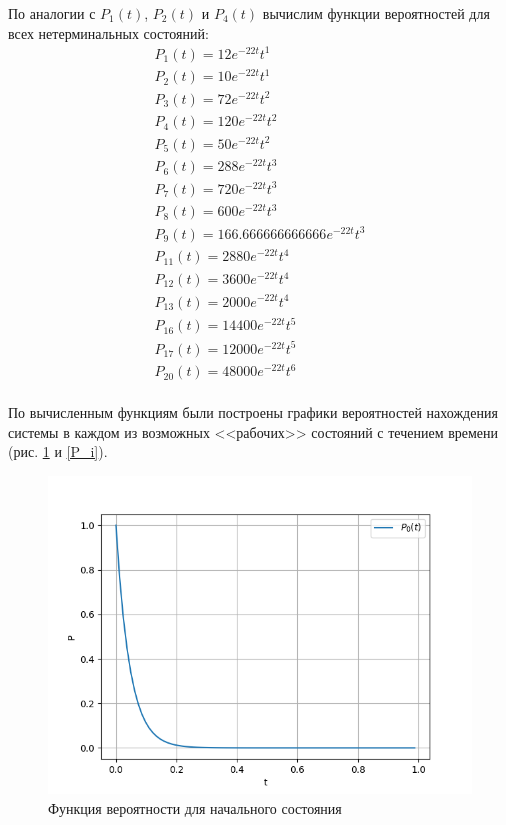 \newpage
По аналогии с $P_1 (t)$, $P_2 (t)$ и $P_4 (t)$ вычислим функции вероятностей для всех нетерминальных состояний:
\begin{gather*}
    P_{1} (t)=12e^{-22t} t^1 \\ 
P_{2} (t)=10e^{-22t} t^1 \\ 
P_{3} (t)=72e^{-22t} t^2 \\ 
P_{4} (t)=120e^{-22t} t^2 \\ 
P_{5} (t)=50e^{-22t} t^2 \\ 
P_{6} (t)=288e^{-22t} t^3 \\ 
P_{7} (t)=720e^{-22t} t^3 \\ 
P_{8} (t)=600e^{-22t} t^3 \\ 
P_{9} (t)=166.666666666666e^{-22t} t^3 \\ 
P_{11} (t)=2880e^{-22t} t^4 \\ 
P_{12} (t)=3600e^{-22t} t^4 \\ 
P_{13} (t)=2000e^{-22t} t^4 \\ 
P_{16} (t)=14400e^{-22t} t^5 \\ 
P_{17} (t)=12000e^{-22t} t^5 \\ 
P_{20} (t)=48000e^{-22t} t^6 \\ 
\end{gather*}

По вычисленным функциям были построены графики вероятностей нахождения системы в каждом из возможных <<рабочих>> состояний с течением времени (рис. \ref{P_0} и \ref{P_i}).
\begin{figure}[H]
\centerline{\includegraphics[scale = 0.8]{Images/graph_0.png}}
\caption{Функция вероятности для начального состояния}
\label{P_0}
\end{figure}

